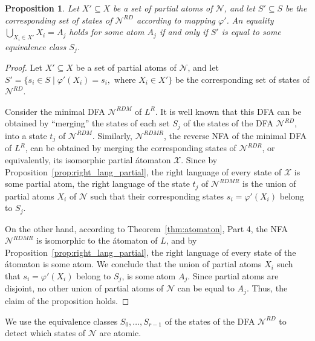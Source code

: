 \documentclass[preprint,12pt]{elsarticle}
\newcommand{\cN}{{\mathcal N}}
\newcommand{\cX}{{\mathcal X}}
\newcommand{\rev}{R}
\newcommand{\deter}{D}
\newcommand{\mini}{M}
\newtheorem{proposition}{Proposition}
\begin{document}
\begin{proposition}
\label{prop:atom_equiv}
Let $X'\subseteq X$ be a set of partial atoms of $\cN$, and 
let $S'\subseteq S$ be the corresponding set of states of $\cN^{\rev\deter}$
according to mapping $\varphi'$.
An equality $\bigcup_{X_i\in X'} X_i = A_j$ holds for some atom $A_j$ if and only if
$S'$ is equal to some equivalence class $S_j$.  
\end{proposition}
\begin{proof}
Let $X'\subseteq X$ be a set of partial atoms of $\cN$, and 
let $S'=\{s_i\in S \mid \varphi'(X_i)= s_i, \text{ where } X_i\in X'\}$ be 
the corresponding set of states of $\cN^{\rev\deter}$.

Consider the minimal DFA $\cN^{\rev\deter\mini}$ of $L^R$.  
It is well known that this DFA can be obtained 
by ``merging'' the states of each set $S_j$ of the states of the DFA
$\cN^{\rev\deter}$, into a state $t_j$ of $\cN^{\rev\deter\mini}$.
Similarly, $\cN^{\rev\deter\mini\rev}$, the reverse NFA of the minimal DFA of $L^R$,
can be obtained by merging the corresponding states of $\cN^{\rev\deter\rev}$, 
or equivalently, its isomorphic partial \'atomaton $\cX$.
Since by Proposition~\ref{prop:right_lang_partial},
the right language of every state of $\cX$ is some partial atom, 
the right language of the state $t_j$ of $\cN^{\rev\deter\mini\rev}$ is
the union of partial atoms $X_i$ of $\cN$ such that their corresponding states
$s_i=\varphi'(X_i)$ belong to $S_j$. 

On the other hand, according to Theorem~\ref{thm:atomaton}, Part 4, 
the NFA $\cN^{\rev\deter\mini\rev}$ is isomorphic to the \'atomaton of $L$, and 
by Proposition~\ref{prop:right_lang_partial},
the right language of every state of the \'atomaton is some atom.
We conclude that the union of partial atoms $X_i$ such that 
$s_i=\varphi'(X_i)$ belong to $S_j$, is some atom $A_j$. 
Since partial atoms are disjoint, no other union of partial atoms
of $\cN$ can be equal to $A_j$. Thus, the claim of the proposition holds.
\end{proof}


We use the equivalence classes $S_0,\ldots,S_{r-1}$ of the states of 
the DFA $\cN^{\rev\deter}$ to detect which states of $\cN$ are atomic.
\end{document}
